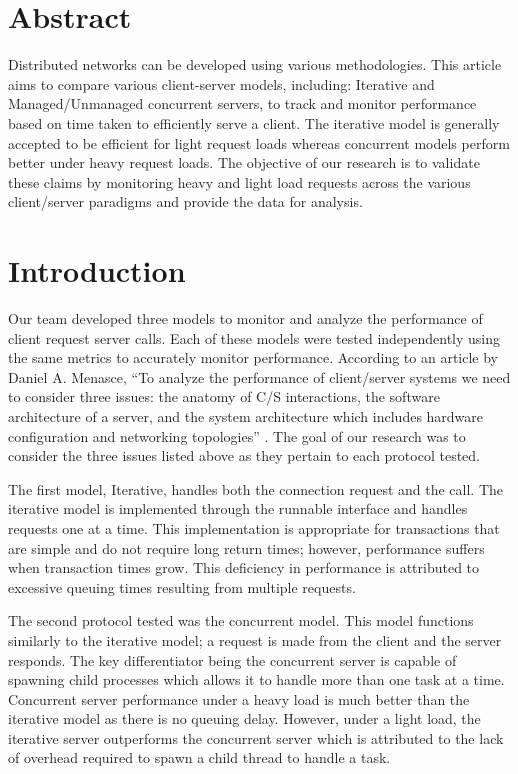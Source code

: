 \section*{Abstract}

Distributed networks can be developed using various methodologies. 
This article aims to compare various client-server models, including: 
Iterative and Managed/Unmanaged concurrent servers, to track and monitor performance based on time taken to efficiently serve a client. 
The iterative model is generally accepted to be efficient for light request loads whereas concurrent models perform better under heavy request loads. 
The objective of our research is to validate these claims by monitoring heavy and light load requests across the various client/server paradigms and provide the data for analysis.

\section{Introduction}

Our team developed three models to monitor and analyze the performance of client request server calls. 
Each of these models were tested independently using the same metrics to accurately monitor performance. 
According to an article by Daniel A. Menasce, 
``To analyze the performance of client/server systems we need to consider three issues: the anatomy of C/S interactions, the software architecture of a server, and the system architecture which includes hardware configuration and networking topologies'' \cite{menasce}.
The goal of our research was to consider the three issues listed above as they pertain to each protocol tested. 

The first model, Iterative, handles both the connection request and the call. 
The iterative model is implemented through the runnable interface and handles requests one at a time. 
This implementation is appropriate for transactions that are simple and do not require long return times; however, performance suffers when transaction times grow. 
This deficiency in performance is attributed to excessive queuing times resulting from multiple requests. 

The second protocol tested was the concurrent model. 
This model functions similarly to the iterative model; a request is made from the client and the server responds. 
The key differentiator being the concurrent server is capable of spawning child processes which allows it to handle more than one task at a time. 
Concurrent server performance under a heavy load is much better than the iterative model as there is no queuing delay. 
However, under a light load, the iterative server outperforms the concurrent server which is attributed to the lack of overhead required to spawn a child thread to handle a task. 

